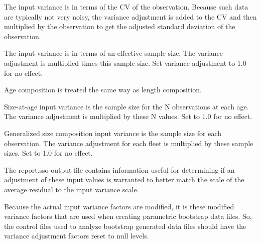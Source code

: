 The input variance is in terms of the CV of the observation.  Because such data are typically not very noisy, the variance adjustment is added to the CV and then multiplied by the observation to get the adjusted standard deviation of the observation.

The input variance is in terms of an effective sample size.  The variance adjustment is multiplied times this sample size.  Set variance adjustment to 1.0 for no effect.

Age composition is treated the same way as length composition.
	
Size-at-age input variance is the sample size for the N observations at each age.  The variance adjustment is multiplied by these N values. Set to 1.0 for no effect.
	
Generalized size composition input variance is the sample size for each observation.  The variance adjustment for each fleet is multiplied by these sample sizes. Set to 1.0 for no effect.
		
The report.sso output file contains information useful for determining if an adjustment of these input values is warranted to better match the scale of the average residual to the input variance scale.
	
Because the actual input variance factors are modified, it is these modified variance factors that are used when creating parametric bootstrap data files.  So, the control files used to analyze bootstrap generated data files should have the variance adjustment factors reset to null levels.


